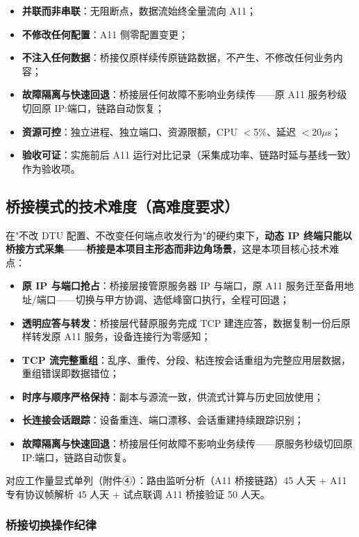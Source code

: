 \documentclass[11pt,a4paper]{ctexart}
\begin{document}
\begin{itemize}[leftmargin=*]
  \item \textbf{并联而非串联}：无阻断点，数据流始终全量流向 A11；
  \item \textbf{不修改任何配置}：A11 侧零配置变更；
  \item \textbf{不注入任何数据}：桥接仅原样续传原链路数据，不产生、不修改任何业务内容；
  \item \textbf{故障隔离与快速回退}：桥接层任何故障不影响业务续传——原 A11 服务秒级切回原 IP:端口，链路自动恢复；
  \item \textbf{资源可控}：独立进程、独立端口、资源限额，CPU $<$5\%、延迟 $<$20$\mu$s；
  \item \textbf{验收可证}：实施前后 A11 运行对比记录（采集成功率、链路时延与基线一致）作为验收项。
\end{itemize}

\subsection{桥接模式的技术难度（高难度要求）}

在"不改 DTU 配置、不改变任何端点收发行为"的硬约束下，\textbf{动态 IP 终端只能以桥接方式采集——桥接是本项目主形态而非边角场景}，这是本项目核心技术难点：

\begin{itemize}[leftmargin=*]
  \item \textbf{原 IP 与端口抢占}：桥接层接管原服务器 IP 与端口，原 A11 服务迁至备用地址/端口——切换与甲方协调、选低峰窗口执行，全程可回退；
  \item \textbf{透明应答与转发}：桥接层代替原服务完成 TCP 建连应答，数据复制一份后原样转发原 A11 服务，设备连接行为零感知；
  \item \textbf{TCP 流完整重组}：乱序、重传、分段、粘连按会话重组为完整应用层数据，重组错误即数据错位；
  \item \textbf{时序与顺序严格保持}：副本与源流一致，供流式计算与历史回放使用；
  \item \textbf{长连接会话跟踪}：设备重连、端口漂移、会话重建持续跟踪识别；
  \item \textbf{故障隔离与快速回退}：桥接层任何故障不影响业务续传——原服务秒级切回原 IP:端口，链路自动恢复。

\end{itemize}

对应工作量显式单列（附件④）：路由监听分析（A11 桥接链路）45 人天 + A11 专有协议帧解析 45 人天 + 试点联调 A11 桥接验证 50 人天。

\subsubsection{桥接切换操作纪律}
\end{document}
